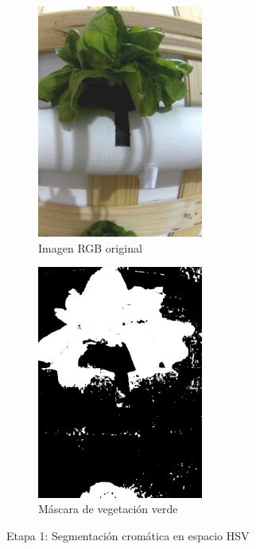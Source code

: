 \begin{figure}[H]
\centering
\begin{subfigure}[b]{0.45\textwidth}
    \centering
    \includegraphics[width=0.6\textwidth]{imagenes/clasificador_1_original.jpg}
    \caption{Imagen RGB original}
\end{subfigure}
\hfill
\begin{subfigure}[b]{0.45\textwidth}
    \centering
    \includegraphics[width=0.6\textwidth]{imagenes/clasificador_2_verde.jpg}
    \caption{Máscara de vegetación verde}
\end{subfigure}
\caption{Etapa 1: Segmentación cromática en espacio HSV}
\label{fig:clasificador_etapa1}
\end{figure}

